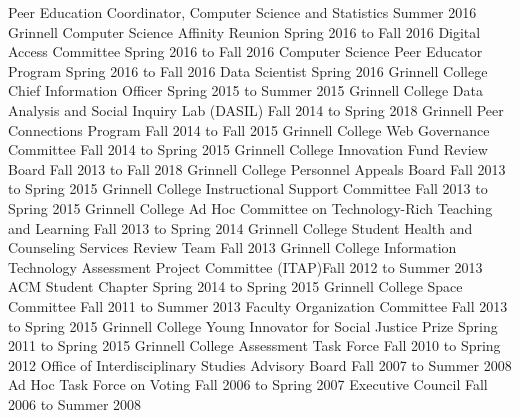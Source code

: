 \begin{cventries}
  {Peer Education Coordinator, Computer Science and Statistics}
  {Summer 2016}
  {Grinnell Computer Science Affinity Reunion}
  {Spring 2016 to Fall 2016}
  {Digital Access Committee}
  {Spring 2016 to Fall 2016}
  {Computer Science Peer Educator Program}
  {Spring 2016 to Fall 2016}
  {Data Scientist}
  {Spring 2016}
  {Grinnell College Chief Information Officer}
  {Spring 2015 to Summer 2015}
  {Grinnell College Data Analysis and Social Inquiry Lab (DASIL)}
  {Fall 2014 to Spring 2018}
  {Grinnell Peer Connections Program}
  {Fall 2014 to Fall 2015}
  {Grinnell College Web Governance Committee}
  {Fall 2014 to Spring 2015}
  {Grinnell College Innovation Fund Review Board}
  {Fall 2013 to Fall 2018}
  {Grinnell College Personnel Appeals Board}
  {Fall 2013 to Spring 2015}
  {Grinnell College Instructional Support Committee}
  {Fall 2013 to Spring 2015}
  {Grinnell College Ad Hoc Committee on Technology-Rich Teaching and Learning}
  {Fall 2013 to Spring 2014}
  {Grinnell College Student Health and Counseling Services Review Team}
  {Fall 2013}
  {Grinnell College Information Technology Assessment Project Committee (ITAP)}{Fall 2012 to Summer 2013}
  {ACM Student Chapter}
  {Spring 2014 to Spring 2015}
  {Grinnell College Space Committee}
  {Fall 2011 to Summer 2013}
  {Faculty Organization Committee}
  {Fall 2013 to Spring 2015}
  {Grinnell College Young Innovator for Social Justice Prize}
  {Spring 2011 to Spring 2015}
  {Grinnell College Assessment Task Force}
  {Fall 2010 to Spring 2012}
  {Office of Interdisciplinary Studies Advisory Board}
  {Fall 2007 to Summer 2008}
  {Ad Hoc Task Force on Voting}
  {Fall 2006 to Spring 2007}
  {Executive Council}
  {Fall 2006 to Summer 2008}

\end{cventries}
